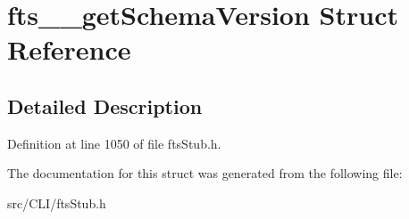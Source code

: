\section{fts\_\-\_\-getSchemaVersion Struct Reference}
\label{structfts____getSchemaVersion}


\subsection{Detailed Description}


Definition at line 1050 of file ftsStub.h.



The documentation for this struct was generated from the following file:\begin{DoxyCompactItemize}
\item 
src/CLI/ftsStub.h\end{DoxyCompactItemize}
